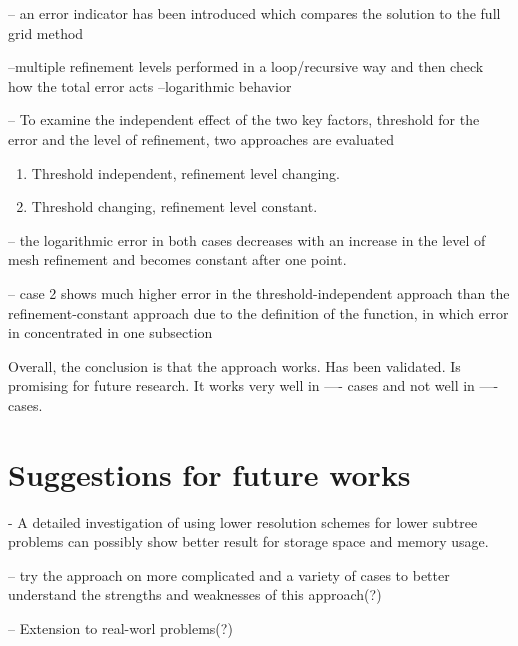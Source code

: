 -- an error indicator has been introduced which compares the solution to the full grid method

--multiple refinement levels performed in a loop/recursive way and then check how the total error acts
--logarithmic behavior


-- To examine the independent effect of the two key factors,  threshold for the error and the level of refinement, two approaches are evaluated
\begin{enumerate}
\item Threshold independent, refinement level changing.
\item Threshold changing, refinement level constant.
\end{enumerate}

-- the logarithmic error in both cases decreases with an increase in the level of mesh refinement and becomes constant after one point.

--  case 2 shows much higher error in the threshold-independent approach than the refinement-constant approach due to the definition of the function, in which error in concentrated in one subsection

Overall, the conclusion is that the approach works. Has been validated. Is promising for future research. It works very well in ---- cases and not well in ---- cases.


\section{Suggestions for future works}
- A detailed investigation of using lower resolution schemes for lower subtree problems can possibly show better result for storage space and memory usage.

--  try the approach on more complicated  and a variety of cases to better understand the strengths and weaknesses of this approach(?)

-- Extension to real-worl problems(?)
